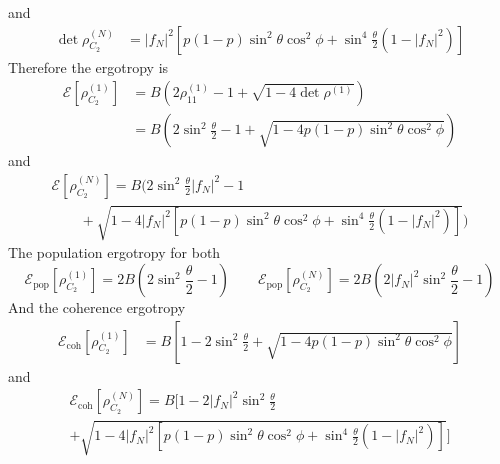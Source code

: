 \documentclass[../../../main.tex]{subfiles}
\begin{document}
and
\begin{align*}
  \det \rho^{(N)}_{C_2} & =
  |f_N|^2 \left[ p(1-p)\sin ^2\theta \cos^2 \phi + \sin ^4 \frac{\theta }{2 }(1-|f_N|^2) \right]
\end{align*}
Therefore the ergotropy is
\begin{align*}
  \mathcal{E} \left[ \rho^{(1)}_{C_2} \right] & =  B \left( 2\rho_{11}^{(1)}- 1 + \sqrt{1-4 \det \rho^{(1)}} \right)                            \\
                                              & = B \left( 2\sin^2 \frac{\theta }{2} - 1 + \sqrt{1 - 4p(1-p)\sin ^2\theta \cos^2 \phi}  \right)
\end{align*}
and
\begin{multline*}
  \mathcal{E} \left[ \rho^{(N)}_{C_2} \right]     = B \bigg( 2\sin^2 \frac{\theta }{2} |f_N|^2 - 1
  \\  \qquad+  \sqrt{1 - 4|f_N|^2 \left[ p(1-p)\sin ^2\theta \cos^2 \phi + \sin ^4 \frac{\theta }{2 }(1-|f_N|^2) \right]}  \bigg)
\end{multline*}
The population ergotropy for both
\begin{equation*}
  \mathcal{E}_\text{pop} \left[ \rho^{(1)}_{C_2} \right]= 2B(2 \sin^2 \frac{\theta }{2 }-1)  \qquad
  \mathcal{E}_\text{pop} \left[ \rho^{(N)}_{C_2} \right]= 2B(2 |f_N|^2\sin^2 \frac{\theta}{2 }-1)
\end{equation*}
And the coherence ergotropy
\begin{align*}
  \mathcal{E}_\text{coh}\left[ \rho^{(1)}_{C_2}\right]
   & = B \left[  1 - 2 \sin ^2 \frac{\theta }{2} + \sqrt{1-4p(1-p)\sin ^2\theta \cos^2 \phi}  \right]
\end{align*}
and
\begin{multline*}
  \mathcal{E}_\text{coh}\left[ \rho^{(N)}_{C_2}\right]
  = B \bigg[  1 - 2 |f_N|^2\sin ^2 \frac{\theta }{2} \\
    + \sqrt{1-4 |f_N|^2 \left[ p(1-p)\sin ^2\theta \cos^2 \phi
        + \sin ^4 \frac{\theta }{2 }(1-|f_N|^2) \right] }  \bigg]
\end{multline*}
\end{document}
